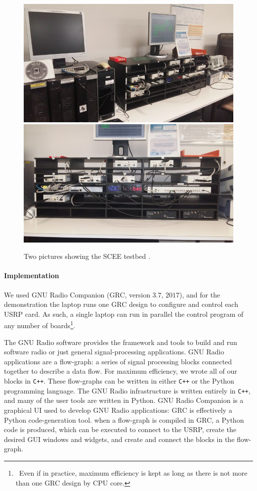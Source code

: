 \begin{figure}[!t]
    \centering
    \includegraphics[width=0.75\linewidth]{SCEE_TestBed1.jpg}
    \vspace*{20pt}
    \includegraphics[width=0.75\linewidth]{SCEE_TestBed2.jpg}
    \caption{Two pictures showing the SCEE testbed \cite[Appendix~3]{Bodinier17}.}
    \label{fig:42:photosSCEETestBed}
\end{figure}


\paragraph{Implementation}

We used GNU Radio Companion (GRC, version $3.7$, $2017$),
and for the demonstration the laptop runs
one GRC design to configure and control each USRP card.
As such, a single laptop can run in parallel the control program of any number of boards\footnote{~Even if in practice, maximum efficiency is kept as long as there is not more than one GRC design by CPU core.}.

The GNU Radio software provides the framework and tools to build and run software radio or just general signal-processing applications.
GNU Radio applications are a flow-graph: a series of signal processing blocks connected together to describe a data flow.
For maximum efficiency, we wrote all of our blocks in \texttt{C++}.
These flow-graphs can be written in either \texttt{C++} or the Python programming language. The GNU Radio infrastructure is written entirely in \texttt{C++}, and many of the user tools are written in Python.
GNU Radio Companion is a graphical UI used to develop GNU Radio applications:
GRC is effectively a Python code-generation tool.
when a flow-graph is compiled in GRC, a Python code is produced, which can be executed to connect to the USRP,
create the desired GUI windows and widgets, and create and connect the blocks in the flow-graph.


